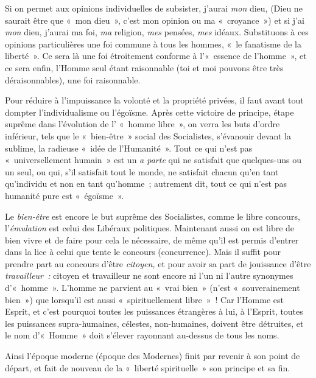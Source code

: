 \documentclass[french,twoside]{book} %
\begin{document}
Si on permet aux opinions individuelles de subsister, j’aurai \emph{mon} dieu, (Dieu ne saurait être que « mon dieu », c’est mon opinion ou ma « croyance ») et si j’ai \emph{mon} dieu, j’aurai ma foi, \emph{ma} religion, \emph{mes} pensées, \emph{mes} idéaux. Substituons à ces opinions particulières une foi commune à tous les hommes, « le fanatisme de la liberté ». Ce sera là une foi étroitement conforme à l’« essence de l’homme », et ce sera enfin, l’Homme seul étant raisonnable (toi et moi pouvons être très déraisonnables), une foi raisonnable.\par
Pour réduire à l’impuissance la volonté et la propriété privées, il faut avant tout dompter l’individualisme ou l’égoïsme. Après cette victoire de principe, étape suprême dans l’évolution de l’ « homme libre », on verra les buts d’ordre inférieur, tels que le « bien-être » social des Socialistes, s’évanouir devant la sublime, la radieuse « idée de l’Humanité ». Tout ce qui n’est pas « universellement humain » est un \emph{a parte} qui ne satisfait que quelques-uns ou un seul, ou qui, s’il satisfait tout le monde, ne satisfait chacun qu’en tant qu’individu et non en tant qu’homme ; autrement dit, tout ce qui n’est pas humanité pure est « égoïsme ».\par
Le \emph{bien-être} est encore le but suprême des Socialistes, comme le libre concours, l’\emph{émulation} est celui des Libéraux politiques. Maintenant aussi on est libre de bien vivre et de faire pour cela le nécessaire, de même qu’il est permis d’entrer dans la lice à celui que tente le concours (concurrence). Mais il suffit pour  prendre part au concours d’être \emph{citoyen,} et pour avoir sa part de jouissance d’être \emph{travailleur :} citoyen et travailleur ne sont encore ni l’un ni l’autre synonymes d’« homme ». L’homme ne parvient au « vrai bien » (n’est « souverainement bien ») que lorsqu’il est aussi « spirituellement libre » ! Car l’Homme est Esprit, et c’est pourquoi toutes les puissances étrangères à lui, à l’Esprit, toutes les puissances supra-humaines, célestes, non-humaines, doivent être détruites, et le nom d’« Homme » doit s’élever rayonnant au-dessus de tous les noms.\par
Ainsi l’époque moderne (époque des Modernes) finit par revenir à son point de départ, et fait de nouveau de la « liberté spirituelle » son principe et sa fin.\par
\end{document}
